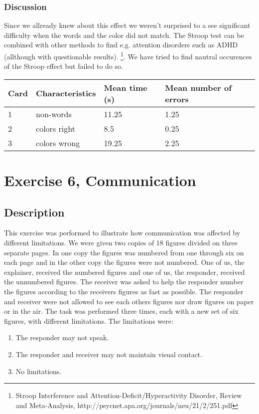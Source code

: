 \documentclass[10pt, a4paper]{article}
\begin{document}
\subsubsection{Discussion}
Since we allready knew about this effect we weren't surprised to a see significant difficulty when the words and the color did not match. The Stroop test can be combined with other methods to find e.g. attention disorders such as ADHD (allthough with questionable results). \footnote{Stroop Interference and Attention-Deficit/Hyperactivity Disorder, Review and Meta-Analysis, http://psycnet.apa.org/journals/neu/21/2/251.pdf}. We have tried to find nautral occurences of the Stroop effect but failed to do so.\\[5mm]

\begin{tabular}{l l l l}
  Card & Characteristics & Mean time (s) & Mean number of errors \\
  \hline
  1 & non-words & 11.25 & 1.25 \\
  2 & colors right & 8.5 & 0.25 \\
  3 & colors wrong & 19.25 & 2.25 \\
\end{tabular}
\section{Exercise 6, Communication}

\subsection{Description}
This exercise was performed to illustrate how communication was affected by different limitations. We were given two copies of 18 figures divided on three separate pages. In one copy the figures was numbered from one through six on each page and in the other copy the figures were not numbered. One of us, the explainer, received the numbered figures and one of us, the responder, received the unnumbered figures. The receiver was asked to help the responder number the figures according to the receivers figures as fast as possible. The responder and receiver were not allowed to see each others figures nor draw figures on paper or in the air. The task was performed three times, each with a new set of six figures, with different limitations.
The limitations were:
\begin{enumerate}
\item The responder may not speak.
\item The responder and receiver may not maintain visual contact.
\item No limitations.
\end{enumerate}
\end{document}

